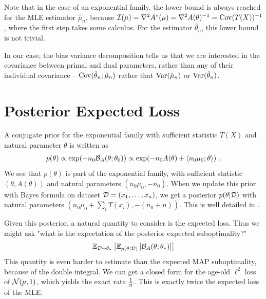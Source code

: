 \documentclass{article}
\newcommand*{\expect}[2][]{\ensuremath{\mathbb{E}_{#1} \left[ #2 \right] }} %
\newcommand{\logpart}{A}
\newcommand{\conj}{\logpart^*}
\newcommand{\bregman}{\cB_\logpart}
\newcommand{\nat}{\theta}
\newcommand{\MAPm}{\hat \mu_n}
\newcommand{\MAPt}{\hat \nat_n}
\begin{document}
Note that in the case of an exponential family, the lower bound is always reached for the MLE estimator $\hat \mu_n$, because $\cI(\mu) = \nabla^2 \conj(\mu) = \nabla^2 \logpart(\nat)^{-1} = \Cov(T(X))^{-1}$, where the first step takes some calculus. For the estimator $\hat \nat_n$, this lower bound is not trivial.

In our case, the bias variance decomposition tells us that we are interested in the covariance between primal and dual parameters, rather than any of their individual covariance -- $\Cov(\MAPt;\MAPm)$ rather that $\Var(\MAPm)$ or $\Var(\MAPt)$.

\section{Posterior Expected Loss}

A conjugate prior for the exponential family with sufficient statistic $T(X)$ and natural parameter $\nat$ is written as
\begin{align}
    p(\nat) 
    \propto \exp(-n_0 \bregman(\nat ; \nat_0)) 
    \propto \exp(-n_0 \logpart(\nat) + \langle n_0 \mu_0 ; \nat \rangle) \; .
\end{align}
We see that $p(\nat)$ is part of the exponential family, with sufficient statistic $(\nat, \logpart(\nat))$ and natural parameters $(n_0 \mu_0 , -n_0)$. When we update this prior with Bayes formula on dataset ${\mathcal D}=(x_1,\dots,x_n)$, we get a posterior $p(\nat | \cD)$ with natural parameters $(n_0 \mu_0 + \sum_i T(x_i) , -(n_0 + n))$. This is well detailed in \citet{agarwal2010geometric}. 

Given this posterior, a natural quantity to consider is the expected loss. Thus we might ask "what is the expectation of the posterior expected suboptimality?"
\begin{align}
    \expect[\cD\sim\nat_*]{\expect[p(\nat|\cD)]{\bregman(\nat ; \nat_*)}}
\end{align}
This quantity is even harder to estimate than the expected MAP suboptimality, because of the double integral. We can get a closed form for the age-old $\ell^2$ loss of ${\mathcal N}(\mu, 1)$, which yields the exact rate $\frac{1}{n}$. This is exactly twice the expected loss of the MLE.
\end{document}
